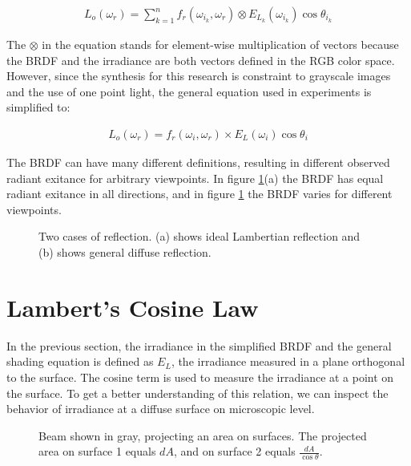 		\begin{eqnarray*}
			L_o(\omega_r) = \sum_{k=1}^n f_r(\omega_{i_k}, \omega_r) \otimes E_{L_k}(\omega_{i_k})\cos\theta_{i_k}
		\end{eqnarray*}

\noindent The $\otimes$ in the equation stands for element-wise multiplication of vectors because the BRDF and the irradiance are both vectors defined in the RGB color space. However, since the synthesis for this research is constraint to grayscale images and the use of one point light, the general equation used in experiments is simplified to:

		\begin{eqnarray*}
			L_o(\omega_r) = f_r(\omega_{i}, \omega_r) \times E_{L}(\omega_{i})\cos\theta_{i}
		\end{eqnarray*}

The BRDF can have many different definitions, resulting in different observed radiant exitance for arbitrary viewpoints. In figure \ref{fig:BRDF}(a) the BRDF has equal radiant exitance in all directions, and in figure \ref{fig:BRDF} the BRDF varies for different viewpoints.

\begin{figure}[H]
	\begin{center}
	\end{center}
	\caption{Two cases of reflection. (a) shows ideal Lambertian reflection and (b) shows general diffuse reflection.}
	\label{fig:BRDF}
\end{figure}

\section{Lambert's Cosine Law}

In the previous section, the irradiance in the simplified BRDF and the general shading equation is defined as $E_L$, the irradiance measured in a plane orthogonal to the surface. The cosine term is used to measure the irradiance at a point on the surface. To get a better understanding of this relation, we can inspect the behavior of irradiance at a diffuse surface on microscopic level.

\begin{figure}[H]
	\begin{center}
	\end{center}
	\caption{Beam shown in gray, projecting an area on surfaces. The projected area on surface 1 equals $dA$, and on surface 2 equals $\frac{dA}{\cos\theta}$. }
	\label{fig:BEAM}
\end{figure}

